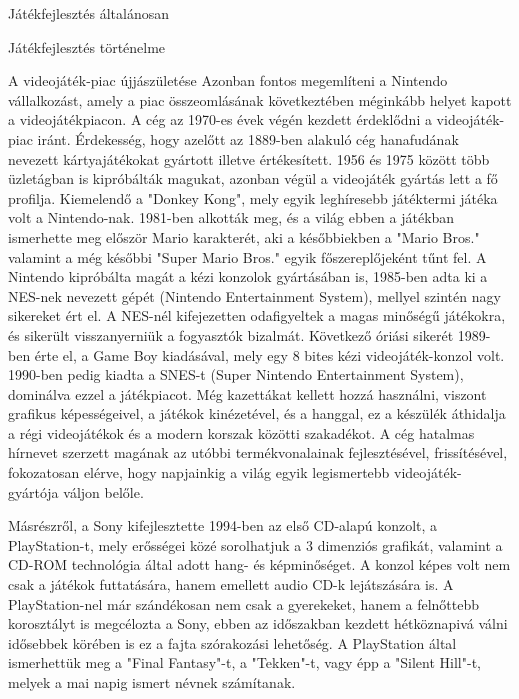 \begin{MyChapter}{Játékfejlesztés általánosan}
\begin{MySection}{Játékfejlesztés történelme}
		\begin{MySubSection}{A videojáték-piac újjászületése}
		Azonban fontos megemlíteni a Nintendo vállalkozást, amely a piac összeomlásának következtében méginkább helyet kapott a videojátékpiacon. A cég az 1970-es évek végén kezdett érdeklődni a videojáték-piac iránt. Érdekesség, hogy azelőtt az 1889-ben alakuló cég hanafudának nevezett kártyajátékokat gyártott illetve értékesített. 1956 és 1975 között több üzletágban is kipróbálták magukat, azonban végül a videojáték gyártás lett a fő profilja. Kiemelendő a "Donkey Kong", mely egyik leghíresebb játéktermi játéka volt a Nintendo-nak. 1981-ben alkották meg, és a világ ebben a játékban ismerhette meg először Mario karakterét, aki a későbbiekben a "Mario Bros." valamint a még későbbi "Super Mario Bros." egyik főszereplőjeként tűnt fel. A Nintendo kipróbálta magát a kézi konzolok gyártásában is, 1985-ben adta ki a NES-nek nevezett gépét (Nintendo Entertainment System), mellyel szintén nagy sikereket ért el. A NES-nél kifejezetten odafigyeltek a magas minőségű játékokra, és sikerült visszanyerniük a fogyasztók bizalmát. Következő óriási sikerét 1989-ben érte el, a Game Boy kiadásával, mely egy 8 bites kézi videojáték-konzol volt. 1990-ben pedig kiadta a SNES-t (Super Nintendo Entertainment System), dominálva ezzel a játékpiacot. Még kazettákat kellett hozzá használni, viszont grafikus képességeivel, a játékok kinézetével, és a hanggal, ez a készülék áthidalja a régi videojátékok és a modern korszak közötti szakadékot. A cég hatalmas hírnevet szerzett magának az utóbbi termékvonalainak fejlesztésével, frissítésével, fokozatosan elérve, hogy napjainkig a világ egyik legismertebb videojáték-gyártója váljon belőle. %
		
		
		Másrészről, a Sony kifejlesztette 1994-ben az első CD-alapú konzolt, a PlayStation-t, mely erősségei közé sorolhatjuk a 3 dimenziós grafikát, valamint a CD-ROM technológia által adott hang- és képminőséget. A konzol képes volt nem csak a játékok futtatására, hanem emellett audio CD-k lejátszására is. A PlayStation-nel már szándékosan nem csak a gyerekeket, hanem a felnőttebb korosztályt is megcélozta a Sony, ebben az időszakban kezdett hétköznapivá válni idősebbek körében is ez a fajta szórakozási lehetőség. A PlayStation által ismerhettük meg a "Final Fantasy"-t, a "Tekken"-t, vagy épp a "Silent Hill"-t, melyek a mai napig ismert névnek számítanak.
		

\end{MySubSection}
\end{MySection}
\end{MyChapter}
